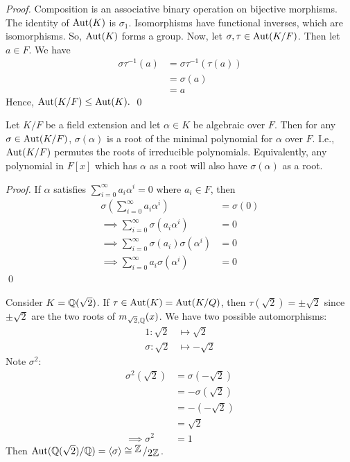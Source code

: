 \begin{proof}
    Composition is an associative binary operation on bijective morphisms. The identity of $\text{Aut}(K)$ is $\sigma_1$. Isomorphisms have functional inverses, which are isomorphisms. So, $\text{Aut}(K)$ forms a group. Now, let $\sigma, \tau \in \text{Aut}(K/F)$. Then let $a\in F$. We have 
    \begin{align*}
        \sigma \tau^{-1}(a) &= \sigma \tau^{-1}(\tau(a)) \\
        &= \sigma(a) \\
        &= a
    \end{align*}
    Hence, $\text{Aut}(K/F) \leq \text{Aut}(K).$
    \qed
\end{proof}

\begin{proposition}
    Let $K/F$ be a field extension and let $\alpha \in K$ be algebraic over $F$. Then for any $\sigma \in \text{Aut}(K / F)$, $\sigma(\alpha)$ is a root of the minimal polynomial for $\alpha$ over $F$. I.e., $\text{Aut}(K / F)$ permutes the roots of irreducible polynomials. Equivalently, any polynomial in $F[x]$ which has $\alpha$ as a root will also have $\sigma(\alpha)$ as a root.
\end{proposition}

\begin{proof}
    If $\alpha$ satisfies $\sum_{i=0}^\infty a_i \alpha^i = 0$ where $a_i \in F$, then 
    \begin{align*}
        \sigma\left(\sum_{i=0}^\infty a_i \alpha^i\right) &= \sigma(0) \\
        \implies \sum_{i=0}^\infty \sigma(a_i \alpha^i) &= 0 \\
        \implies \sum_{i=0}^\infty \sigma(a_i) \sigma(\alpha^i) &= 0 \\
        \implies \sum_{i=0}^\infty a_i \sigma(\alpha^i) &= 0
    \end{align*}
    \qed
\end{proof}

\begin{example}
    Consider $K = \mathbb{Q}(\sqrt{2})$. If $\tau \in \text{Aut}(K) = \text{Aut}(K/Q)$, then $\tau(\sqrt{2}) = \pm \sqrt{2}$ since $\pm \sqrt{2}$ are the two roots of $m_{\sqrt{2}, \mathbb{Q}}(x)$. We have two possible automorphisms:
    \begin{align*}
        1: \sqrt{2} &\mapsto \sqrt{2} \\
        \sigma : \sqrt{2} &\mapsto -\sqrt{2}
    \end{align*}
    Note $\sigma^2$:
    \begin{align*}
        \sigma^2(\sqrt{2}) &= \sigma(-\sqrt{2}) \\
        &= -\sigma(\sqrt{2}) \\
        &= -(-\sqrt{2}) \\ 
        &= \sqrt{2} \\
        \implies \sigma^2 &= 1
    \end{align*}
    Then $\Aut{\Q(\sqrt{2})/\Q} = \cyc{\sigma} \cong \quotient{\Z}{2\Z}$.
\end{example}

